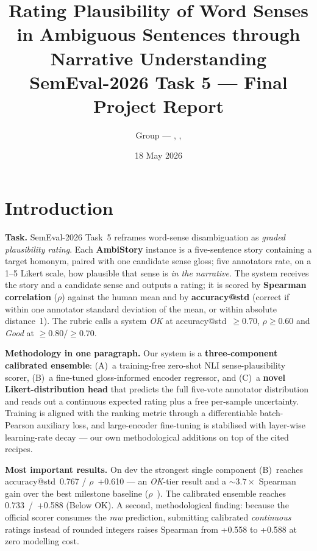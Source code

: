 \documentclass[11pt]{article}
\title{\textbf{Rating Plausibility of Word Senses in Ambiguous Sentences
through Narrative Understanding}\\[2pt]
\large SemEval-2026 Task 5 --- Final Project Report}
\author{Group \GROUP{} --- \MEMBERA{}, \MEMBERB{}, \MEMBERC{}}
\date{18 May 2026}
\newcommand{\Bacc}{0.767}\newcommand{\Brho}{+0.610}
\newcommand{\EnsAcc}{0.733}\newcommand{\EnsRho}{+0.588}
\newcommand{\EnsVerdict}{Below OK}              %
\newcommand{\AblIntRho}{+0.558}\newcommand{\AblContRho}{+0.588}
\begin{document}
\maketitle

\section{Introduction}
\textbf{Task.} SemEval-2026 Task~5 reframes word-sense disambiguation as
\emph{graded plausibility rating}. Each \textbf{AmbiStory} instance is a
five-sentence story containing a target homonym, paired with one candidate
sense gloss; five annotators rate, on a 1--5 Likert scale, how plausible that
sense is \emph{in the narrative}. The system receives the story and a
candidate sense and outputs a rating; it is scored by \textbf{Spearman
correlation} ($\rho$) against the human mean and by \textbf{accuracy@std}
(correct if within one annotator standard deviation of the mean, or within
absolute distance~1). The rubric calls a system \emph{OK} at
accuracy@std~$\ge0.70$, $\rho\ge0.60$ and \emph{Good} at $\ge0.80/\ge0.70$.

\textbf{Methodology in one paragraph.} Our system is a \textbf{three-component
calibrated ensemble}: (A)~a training-free zero-shot NLI sense-plausibility
scorer, (B)~a fine-tuned gloss-informed encoder regressor, and (C)~a
\textbf{novel Likert-distribution head} that predicts the full five-vote
annotator distribution and reads out a continuous expected rating plus a free
per-sample uncertainty. Training is aligned with the ranking metric through a
differentiable batch-Pearson auxiliary loss, and large-encoder fine-tuning is
stabilised with layer-wise learning-rate decay --- our own methodological
additions on top of the cited recipes.

\textbf{Most important results.} On dev the strongest single component
(B)~reaches accuracy@std~\Bacc{} / $\rho$~\Brho{} --- an \emph{OK}-tier
result and a $\sim$$3.7\times$ Spearman gain over the best milestone baseline
($\rho$~\blRidgeRho{}). The calibrated ensemble reaches \EnsAcc{}~/~\EnsRho{}
(\EnsVerdict). A second, methodological finding: because the official scorer
consumes the \emph{raw} prediction, submitting calibrated \emph{continuous}
ratings instead of rounded integers raises Spearman from \AblIntRho{} to
\AblContRho{} at zero modelling cost.

\end{document}
